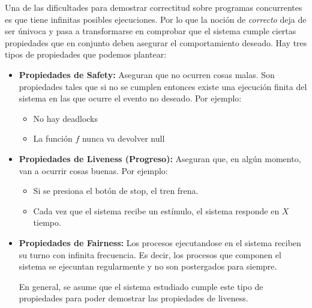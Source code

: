 \vspace*{.5cm}
Una de las dificultades para demostrar correctitud sobre 
programas concurrentes es que tiene infinitas posibles ejecuciones. Por lo que la noción de \textit{correcto} deja de ser únivoca y pasa a transformarse en comprobar que el sistema cumple ciertas propiedades que en conjunto deben asegurar el comportamiento deseado. Hay tres tipos de propiedades que podemos plantear: 

\begin{itemize}
	\item \textbf{Propiedades de Safety:} Aseguran que no ocurren cosas malas. Son propiedades tales que si no se cumplen entonces existe una ejecución finita del sistema en las que ocurre el evento no deseado. Por ejemplo:
	\begin{itemize}
		\item No hay deadlocks
		\item La función $f$ nunca va devolver null
	\end{itemize}

	\item \textbf{Propiedades de Liveness (Progreso):} Aseguran que, en algún momento, van a ocurrir cosas buenas. Por ejemplo:
	\begin{itemize}
		\item Si se presiona el botón de stop, el tren frena.
		\item Cada vez que el sistema recibe un estímulo, el sistema responde en $X$ tiempo.
	\end{itemize}
	\item \textbf{Propiedades de Fairness:} Los procesos ejecutandose en el sistema reciben su turno con infinita frecuencia. Es decir, los procesos que componen el sistema se ejecuntan regularmente y no son postergados para siempre.
	
	En general, se asume que el sistema estudiado cumple este tipo de propiedades para poder demostrar las propiedades de liveness.
\end{itemize}

